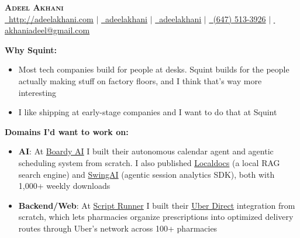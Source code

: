 \documentclass[letterpaper,11pt]{article}
\begin{document}
\begin{center}
    \textbf{\Huge \scshape Adeel Akhani} \\ \vspace{1pt}
    \small
    \href{http://adeelakhani.com/}{\faGlobe\, \underline{http://adeelakhani.com}} $|$
    \href{https://www.linkedin.com/in/adeelakhani/}{\faLinkedin\, \underline{adeelakhani}} $|$
    \href{https://github.com/adeelakhani}{\faGithub\, \underline{adeelakhani}} $|$
    \href{tel:(647) 513-3926}{\faMobile*\, (647) 513-3926} $|$
    \href{mailto:akhaniadeel@gmail.com}{\faEnvelope\, \underline{akhaniadeel@gmail.com}}
\end{center}

\vspace{15pt}

\noindent \textbf{Why Squint:}
\begin{itemize}[leftmargin=15pt]
    \item Most tech companies build for people at desks. Squint builds for the people actually making stuff on factory floors, and I think that's way more interesting
    \item I like shipping at early-stage companies and I want to do that at Squint
\end{itemize}

\vspace{4pt}
\noindent \textbf{Domains I'd want to work on:}
\begin{itemize}[leftmargin=15pt]
    \item \textbf{AI}: At \href{https://www.boardy.ai/}{Boardy AI} I built their autonomous calendar agent and agentic scheduling system from scratch. I also published \href{https://github.com/adeelakhani/localDocs}{Localdocs} (a local RAG search engine) and \href{https://www.npmjs.com/package/swing-sdk}{SwingAI} (agentic session analytics SDK), both with 1,000+ weekly downloads
    \item \textbf{Backend/Web}: At \href{https://scriptrunner.ai/}{Script Runner} I built their \href{https://ca.finance.yahoo.com/news/script-runner-uber-direct-partner-140000175.html}{Uber Direct} integration from scratch, which lets pharmacies organize prescriptions into optimized delivery routes through Uber's network across 100+ pharmacies
\end{itemize}
\end{document}
